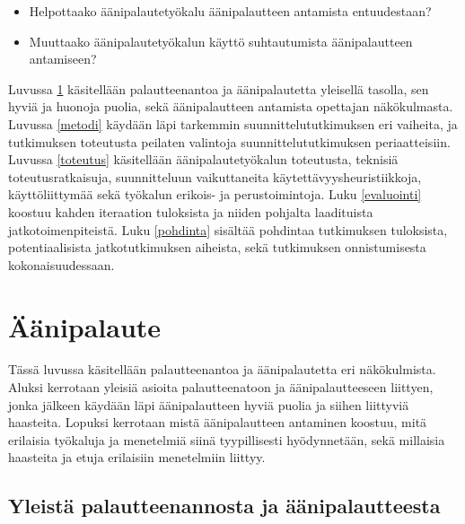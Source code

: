\documentclass[utf8]{gradu3}
\begin{document}
\begin{itemize}
  \item Helpottaako äänipalautetyökalu äänipalautteen antamista entuudestaan?
  \item Muuttaako äänipalautetyökalun käyttö suhtautumista äänipalautteen antamiseen?
\end{itemize}

Luvussa \ref{raf} käsitellään palautteenantoa ja äänipalautetta yleisellä tasolla, sen hyviä ja huonoja puolia, sekä äänipalautteen antamista opettajan näkökulmasta. Luvussa \ref{metodi} käydään läpi tarkemmin suunnittelututkimuksen eri vaiheita, ja tutkimuksen toteutusta peilaten valintoja suunnittelututkimuksen periaatteisiin. Luvussa \ref{toteutus} käsitellään äänipalautetyökalun toteutusta, teknisiä toteutusratkaisuja, suunnitteluun vaikuttaneita käytettävyysheuristiikkoja, käyttöliittymää sekä työkalun erikois- ja perustoimintoja. Luku \ref{evaluointi} koostuu kahden iteraation tuloksista ja niiden pohjalta laadituista jatkotoimenpiteistä. Luku \ref{pohdinta} sisältää pohdintaa tutkimuksen tuloksista, potentiaalisista jatkotutkimuksen aiheista, sekä tutkimuksen onnistumisesta kokonaisuudessaan. 

\chapter{Äänipalaute}
\label{raf}

Tässä luvussa käsitellään palautteenantoa ja äänipalautetta eri näkökulmista. Aluksi kerrotaan yleisiä asioita palautteenatoon ja äänipalautteeseen liittyen, jonka jälkeen käydään läpi äänipalautteen hyviä puolia ja siihen liittyviä haasteita. Lopuksi kerrotaan mistä äänipalautteen antaminen koostuu, mitä erilaisia työkaluja ja menetelmiä siinä tyypillisesti hyödynnetään, sekä millaisia haasteita ja etuja erilaisiin menetelmiin liittyy.

\section{Yleistä palautteenannosta ja äänipalautteesta}
\end{document}
